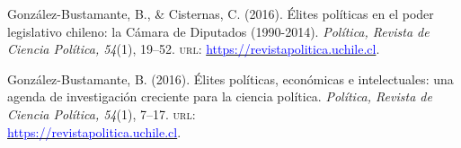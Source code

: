 \begin{publications}
\begin{benumerate}{14}

\item{\small González-Bustamante, B., \& Cisternas, C. (2016). Élites políticas en el poder legislativo chileno: la Cámara de Diputados (1990-2014). {\itshape Política, Revista de Ciencia Política, 54}(1), 19--52. {\scshape url:} \href{https://revistapolitica.uchile.cl/index.php/RP/article/view/42691}{\textcolor{blue}{https://revistapolitica.uchile.cl}}.}\vspace{1mm}


\item{\small González-Bustamante, B. (2016). Élites políticas, económicas e intelectuales: una agenda de investigación creciente para la ciencia política. {\itshape Política, Revista de Ciencia Política, 54}(1), 7--17. {\scshape url:} \\ \href{https://revistapolitica.uchile.cl/index.php/RP/article/view/42690}{\textcolor{blue}{https://revistapolitica.uchile.cl}}.}\vspace{1mm}



\end{benumerate}
\end{publications}
